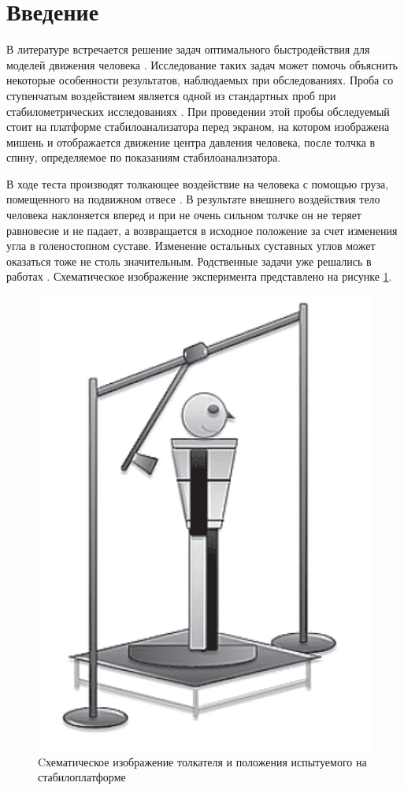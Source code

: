 \documentclass[a4paper,12pt, openany]{book}
\theoremstyle{plain} %
\theoremstyle{definition} %
\theoremstyle{remark} %
\numberwithin{equation}{chapter}
\begin{document}
\thispagestyle{empty} %
 \normalsize{
\newpage

\tableofcontents

\newpage


\chapter*{Введение}
В литературе встречается решение задач оптимального быстродействия для моделей движения человека \cite{pandy,humanMovements}. Исследование таких задач может помочь объяснить некоторые особенности результатов, наблюдаемых при обследованиях.
Проба со ступенчатым воздействием является одной из стандартных проб
при стабилометрических исследованиях \cite{AdaptFizkult,stabilographTest}. При проведении этой пробы
обследуемый стоит на платформе стабилоанализатора перед экраном, на
котором изображена мишень и отображается движение центра давления
человека, после толчка в спину, определяемое по показаниям стабилоанализатора.

В ходе теста производят толкающее воздействие на человека с помощью груза, помещенного на подвижном отвесе \cite{pusher}. В результате внешнего
воздействия тело человека наклоняется вперед и при не очень сильном толчке
он не теряет равновесие и не падает, а возвращается в исходное
положение за счет изменения угла в голеностопном суставе. Изменение
остальных суставных углов может оказаться тоже не столь значительным.
Родственные задачи уже решались в работах \cite{PAKrychinin,kasatkin}.
Схематическое изображение эксперимента представлено на рисунке \ref{fig:pusher}.
\begin{figure}[h!]
    \centering
    \includegraphics[width=0.35\linewidth]{human.png}
    \caption{Cхематическое изображение толкателя и
        положения испытуемого на стабилоплатформе}
    \label{fig:pusher}
\end{figure}

}
\end{document}
